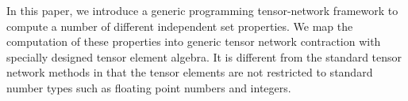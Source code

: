 \documentclass[onefignum, onetabnum]{siamart190516}
\newcommand{\<}{\langle}
\renewcommand{\>}{\rangle}
\newcommand{\red}[1]{[{\bf  \color{red}{ST: #1}}]}
\newcounter{example}
\begin{document}
In this paper, we introduce a generic programming tensor-network framework to compute a number of different independent set properties.
We map the computation of these properties into generic tensor network contraction with specially designed tensor element algebra.
It is different from the standard tensor network methods in that the tensor elements are not restricted to standard number types such as floating point numbers and integers.
\end{document}
